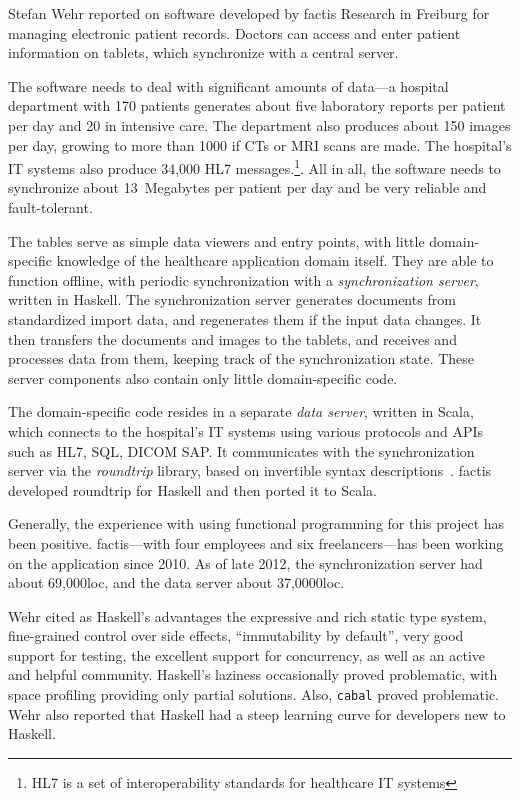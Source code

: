\documentclass{jfp1}
\begin{document}
Stefan Wehr reported on software developed by factis Research in
Freiburg for managing electronic patient records. Doctors can access
and enter patient information on tablets, which synchronize with a central
server.

The software needs to deal with significant amounts of data---a hospital
department with 170 patients generates about five laboratory reports per
patient per day and 20 in intensive care. The department also produces
about 150 images per day, growing to more than 1000 if CTs or MRI
scans are made.  The hospital's IT systems also produce 34,000 HL7
messages.\footnote{HL7 is a set of interoperability standards for healthcare
IT systems}. All in all, the software needs to synchronize about
13~Megabytes per patient per day and be very reliable and fault-tolerant.

The tables serve as simple data viewers and entry points, with little
domain-specific knowledge of the healthcare application domain itself.
They are able to function offline, with periodic synchronization with
a \textit{synchronization server}, written in Haskell.  The
synchronization server generates documents from standardized import
data, and regenerates them if the input data changes.  It then
transfers the documents and images to the tablets, and receives and
processes data from them, keeping track of the synchronization state.
These server components also contain only little domain-specific code.

The domain-specific code resides in a separate \textit{data server},
written in Scala, which connects to the hospital's IT systems using
various protocols and APIs such as HL7, SQL, DICOM SAP.  It
communicates with the synchronization server via the
\textit{roundtrip} library, based on invertible syntax
descriptions~\cite{Rendel:2010:ISD:1863523.1863525}.  factis developed
roundtrip for Haskell and then ported it to Scala.

Generally, the experience with using functional programming for this
project has been positive.  factis---with four employees and
six freelancers---has been working on the application since 2010.
As of late 2012, the synchronization server had about 69,000loc, and the data
server about 37,0000loc.

Wehr cited as Haskell's advantages the expressive and rich static
type system, fine-grained control over side effects, ``immutability by
default'', very good support for testing, the excellent support for
concurrency, as well as an active and helpful community.  Haskell's
laziness occasionally proved problematic, with space profiling
providing only partial solutions.  Also, {\tt cabal} proved problematic.
Wehr also reported that Haskell had a steep learning curve for developers
new to Haskell.
\end{document}
